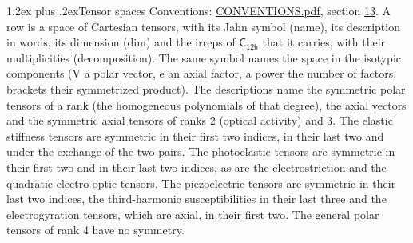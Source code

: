\documentclass[10pt,a4paper]{article}
\makeatletter
\renewcommand\section{\@startsection{section}{1}{\z@}{-3ex plus -1ex minus -.2ex}%
  {1.2ex plus .2ex}{\normalfont\large\sffamily\bfseries\color{parttitle}}}
\numberwithin{equation}{section}
\newcommand{\grp}[1]{\mathsf{#1}}
\makeatother
\begin{document}
\section{Tensor spaces}\label{s:tensor_spaces}
Conventions: \href{../../CONVENTIONS.pdf}{CONVENTIONS.pdf}, section \href{../../CONVENTIONS.pdf\#conv.13}{13}.
\leavevmode\label{n:head.name}\label{n:head.description}\label{n:head.dim}\label{n:head.decomposition}A row is a space of Cartesian tensors, with its Jahn symbol (name), its description in words, its dimension (dim) and the irreps of $\grp{C_{12h}}$ that it carries, with their multiplicities (decomposition). \label{n:label.jahn}The same symbol names the space in the isotypic components (V a polar vector, e an axial factor, a power the number of factors, brackets their symmetrized product). The descriptions name the symmetric polar tensors of a rank (the homogeneous polynomials of that degree), the axial vectors and the symmetric axial tensors of ranks 2 (optical activity) and 3. The elastic stiffness tensors are symmetric in their first two indices, in their last two and under the exchange of the two pairs. The photoelastic tensors are symmetric in their first two and in their last two indices, as are the electrostriction and the quadratic electro-optic tensors. The piezoelectric tensors are symmetric in their last two indices, the third-harmonic susceptibilities in their last three and the electrogyration tensors, which are axial, in their first two. The general polar tensors of rank 4 have no symmetry.
\end{document}
